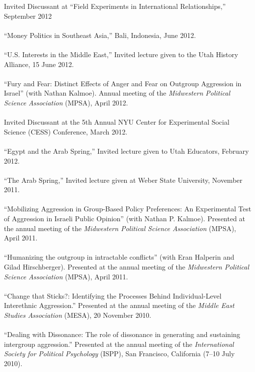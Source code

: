 \documentclass[10pt]{article}
\begin{document}
Invited Discussant at ``Field Experiments in International Relationships,'' September 2012\\
\ \\
``Money Politics in Southeast Asia,'' Bali, Indonesia, June 2012.\\
\ \\
``U.S. Interests in the Middle East,'' Invited lecture given to the Utah History Alliance, 15 June 2012.\\
\ \\
``Fury and Fear: Distinct Effects of Anger and Fear on Outgroup Aggression in Israel'' (with Nathan Kalmoe).  Annual meeting of the {\em Midwestern Political Science Association} (MPSA), April 2012.\\
\ \\
Invited Discussant at the 5th Annual NYU Center for Experimental Social Science (CESS) Conference, March 2012.\\
\ \\
``Egypt and the Arab Spring,'' Invited lecture given to Utah Educators, February 2012.\\
\ \\
``The Arab Spring,'' Invited lecture given at Weber State University, November 2011.\\
\ \\
``Mobilizing Aggression in Group-Based Policy Preferences: An Experimental Test of Aggression in Israeli Public Opinion'' (with Nathan P. Kalmoe).  Presented at the annual meeting of the {\em Midwestern Political Science Association} (MPSA), April 2011.\\
\ \\
``Humanizing the outgroup in intractable conflicts'' (with Eran Halperin and Gilad Hirschberger).  Presented at the annual meeting of the {\em Midwestern Political Science Association} (MPSA), April 2011.\\
\ \\
``Change that Sticks?: Identifying the Processes Behind Individual-Level Interethnic Aggression.'' Presented at the annual meeting of the {\em Middle East Studies Association} (MESA), 20 November 2010.\\
\ \\
``Dealing with Dissonance: The role of dissonance in generating and sustaining intergroup aggression.''  Presented at the annual meeting of the {\em International Society for Political Psychology} (ISPP), San Francisco, California (7--10 July 2010).\\
\ \\
\end{document}
